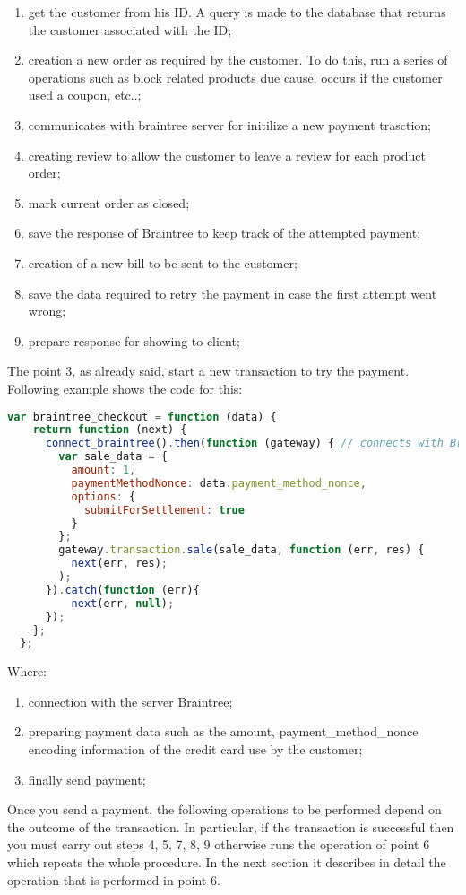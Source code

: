 \begin{enumerate}
\item get the customer from his ID. A query is made to the database that returns the customer associated with the ID;
\item creation a new order as required by the customer. To do this, run a series of operations such as block related products due cause, occurs if the customer used a coupon, etc..;
\item communicates with braintree server for initilize a new payment trasction;
\item creating review to allow the customer to leave a review for each product order;
\item mark current order as closed;
\item save the response of Braintree to keep track of the attempted payment;
\item creation of a new bill to be sent to the customer;
\item save the data required to retry the payment in case the first attempt went wrong;
\item prepare response for showing to client;
\end{enumerate}
The point 3, as already said, start a new transaction to try the payment. Following example shows the code for this:
\begin{lstlisting}[language=javascript]
  var braintree_checkout = function (data) {
    return function (next) {
      connect_braintree().then(function (gateway) { // connects with Braintree server
        var sale_data = {
          amount: 1,
          paymentMethodNonce: data.payment_method_nonce,
          options: {
            submitForSettlement: true
          }
        };
        gateway.transaction.sale(sale_data, function (err, res) {
          next(err, res);
        );
      }).catch(function (err){
          next(err, null);
      });
    };
  };
\end{lstlisting}
Where:
\begin{enumerate}
\item connection with the server Braintree;
\item preparing payment data such as the amount, payment\_method\_nonce encoding information of the credit card use by the customer;
\item finally send payment;
\end{enumerate}
Once you send a payment, the following operations to be performed depend on the outcome of the transaction. In particular, if the transaction is successful then you must carry out steps 4, 5, 7, 8, 9 otherwise runs the operation of point 6 which repeats the whole procedure.
\newline
In the next section it describes in detail the operation that is performed in point 6.